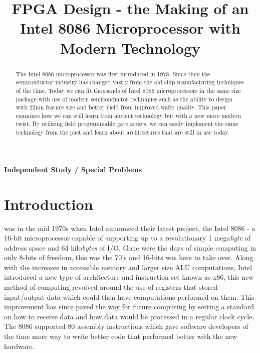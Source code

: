 \documentclass[11pt,peerreviewca]{IEEEtran}
\begin{document}
\title{FPGA Design - the Making of an Intel 8086 Microprocessor with Modern Technology}

\ifCLASSOPTIONconference
\author{
}
\fi
\maketitle

\ifCLASSOPTIONpeerreview
\begin{center} \bfseries Independent Study / Special Problems \end{center}
\fi
%
\IEEEpeerreviewmaketitle

\begin{abstract}
The Intel 8086 microprocessor was first introduced in 1978. Since then the semiconductor industry has changed vastly from the old chip manufacturing techniques of the time. Today we can fit thousands of Intel 8086 microprocessors in the same size package with use of modern semiconductor techniques such as the ability to design with 22nm feature size and better yield from improved wafer quality. This paper examines how we can still learn from ancient technology but with a new more modern twist. By utilizing field programmable gate arrays, we can easily implement the same technology from the past and learn about architectures that are still in use today.
\end{abstract}

\section{Introduction}
 was in the mid 1970s when Intel announced their latest project, the Intel 8086 -  a 16-bit microprocessor capable of supporting up to a revolutionary 1 mega{\em byte} of address space and 64 kilo{\em bytes} of I/O. Gone were the days of simple computing in only 8-bits of freedom, this was the 70's and 16-bits was here to take over. Along with the increases in accessible memory and larger size ALU computations, Intel introduced a new type of architecture and instruction set known as x86, this new method of computing revolved around the use of registers that stored input/output data which could then have computations performed on them. This improvement has since paved the way for future computing by setting a standard on how to receive data and how data would be processed in a regular clock cycle. The 8086 supported 80 assembly instructions which gave software developers of the time more way to write better code that performed better with the new hardware.
\end{document}
